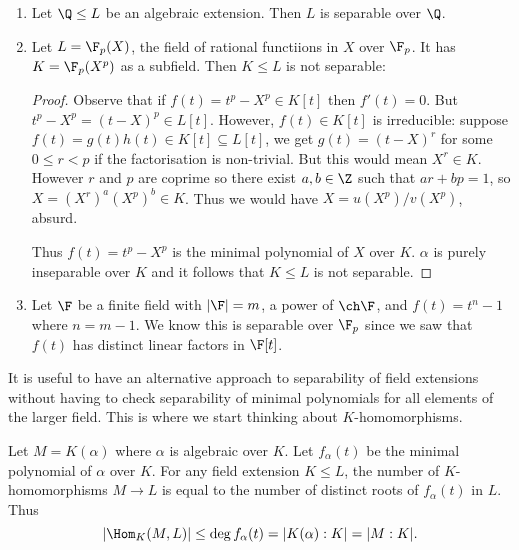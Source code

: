 \documentclass[a4paper]{article}
\begin{document}
\begin{eg}\leavevmode
  \begin{enumerate}
  \item Let \(\Q \leq L\) be an algebraic extension. Then \(L\) is separable over \(\Q\).
  \item Let \(L = \F_p(X)\), the field of rational functiions in \(X\) over \(\F_p\). It has \(K = \F_p(X^p)\) as a subfield. Then \(K \leq L\) is not separable:
    \begin{proof}
      Observe that if \(f(t) = t^p - X^p \in K[t]\) then \(f'(t) = 0\). But \(t^p - X^p = (t - X)^p \in L[t]\). However, \(f(t) \in K[t]\) is irreducible: suppose \(f(t) = g(t)h(t) \in K[t] \subseteq L[t]\), we get \(g(t) = (t - X)^r\) for some \(0 \leq r < p\) if the factorisation is non-trivial. But this would mean \(X^r \in K\). However \(r\) and \(p\) are coprime so there exist \(a, b \in \Z\) such that \(ar + bp = 1\), so \(X = (X^r)^a (X^p)^b \in K\). Thus we would have \(X = u(X^p)/v(X^p)\), absurd.

      Thus \(f(t) = t^p - X^p\) is the minimal polynomial of \(X\) over \(K\). \(\alpha\) is purely inseparable over \(K\) and it follows that \(K \leq L\) is not separable.
    \end{proof}
  \item Let \(\F\) be a finite field with \(|\F| = m\), a power of \(\ch \F\), and \(f(t) = t^n - 1\) where \(n = m - 1\). We know this is separable over \(\F_p\) since we saw that \(f(t)\) has distinct linear factors in \(\F[t]\).
  \end{enumerate}
\end{eg}

\begin{remark}
  It is useful to have an alternative approach to separability of field extensions without having to check separability of minimal polynomials for all elements of the larger field. This is where we start thinking about \(K\)-homomorphisms.
\end{remark}

\begin{lemma}
  \label{lem:homomophism of algebraic extension}
  Let \(M = K(\alpha)\) where \(\alpha\) is algebraic over \(K\). Let \(f_\alpha(t)\) be the minimal polynomial of \(\alpha\) over \(K\). For any field extension \(K \leq L\), the number of \(K\)-homomorphisms \(M \to L\) is equal to the number of distinct roots of \(f_\alpha(t)\) in \(L\). Thus
  \[
    |\Hom_K(M, L)| \leq \deg f_\alpha(t) = |K(\alpha):K| = |M:K|.
  \]
\end{lemma}
\end{document}
